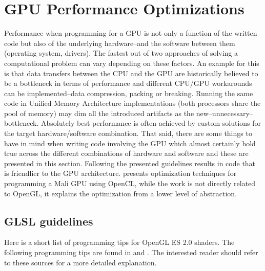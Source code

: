 \documentclass[conference]{IEEEtran}
\begin{document}

\section{GPU Performance Optimizations} %
Performance when programming for a GPU is not only a function of the written code but also of the underlying hardware--and the software between them (operating system, drivers). The fastest out of two approaches of solving a computational problem can vary depending on these factors. An example for this is that data transfers between the CPU and the GPU are historically believed to be a bottleneck in terms of performance and different CPU/GPU workarounds can be implemented--data compression, packing or breaking. Running the same code in Unified Memory Architecture implementations (both processors share the pool of memory) may dim all the introduced artifacts as the new--unnecessary--bottleneck. Absolutely best performance is often achieved by custom solutions for the target hardware/software combination. That said, there are some things to have in mind when writing code involving the GPU which almost certainly hold true across the different combinations of hardware and software and these are presented in this section. Following the presented guidelines results in code that is friendlier to the GPU architecture. \cite{grasso14} presents optimization techniques for programming a Mali GPU using OpenCL, while the work is not directly related to OpenGL, it explains the optimization from a lower level of abstraction.%

 \subsection{GLSL guidelines}
Here is a short list of programming tips for OpenGL ES 2.0 shaders. The following programming tips are found in \cite{singhal12} and \cite{appleopengl}. The interested reader should refer to these sources for a more detailed explanation. %
\end{document}
